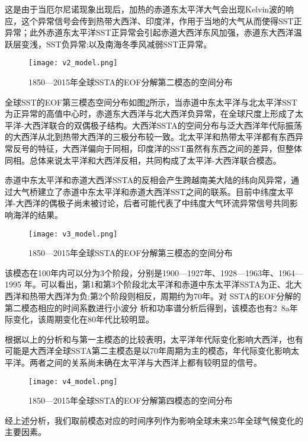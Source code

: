 \documentclass[bwprint]{gmcmthesis}
\begin{document}
这是由于当厄尔尼诺现象出现后，加热的赤道东太平洋大气会出现Kelvin波的响应，这个异常信号会传到热带大西洋、印度洋，作用于当地的大气从而使得SST正异常；此外赤道东太平洋SST正异常会引起赤道大西洋东风加强，赤道东大西洋温跃层变浅\cite{Dunstone2010Impact}，SST负异常;以及南海冬季风减弱SST正异常\cite{Nicholls1999Cognitive}。

\begin{figure}[ht]
\centering
\texttt{[image: v2\_model.png]}
\caption{1850—2015年全球SSTA的EOF分解第二模态的空间分布}\label{v2m}
\end{figure}

全球SST的EOF第三模态空间分布如图\ref{v3m}所示，当赤道中东太平洋与北太平洋SST为正异常的高值中心时，赤道东大西洋与北大西洋负异常，在全球尺度上形成了太平洋-大西洋联合的双偶极子结构。大西洋SSTA的空间分布与泛大西洋年代际振荡的大西洋从北到热带大西洋的三极分布较一致。北太平洋和热带太平洋都有东西异常反号的特征，大西洋偏向于同相，印度洋的SST虽然有东西之间的差异，但整体同相。总体来说太平洋和大西洋反相\cite{Dunstone2010Impact}，共同构成了太平洋-大西洋联合模态。

赤道中东太平洋和赤道大西洋SSTA的反相会产生跨越南美大陆的纬向风异常，通过大气桥建立了赤道中东太平洋和赤道大西洋SST之间的联系。目前中纬度太平洋-大西洋的偶极子尚未被讨论，后者可能代表了中纬度大气环流异常信号共同影响海洋的结果。

\begin{figure}[ht]
\centering
\texttt{[image: v3\_model.png]}
\caption{1850—2015年全球SSTA的EOF分解第三模态的空间分布}\label{v3m}
\end{figure}

该模态在100年内可以分为3个阶段，分别是1900—1927年、1928—1963年、1964—1995 年。可以看出，第1和第3个阶段北太平洋和赤道中东太平洋SSTA为正、北大西洋和热带大西洋为负;第2个阶段则相反，周期约为70年。对 SSTA的EOF分解的第二模态相应的时间系数进行小波分 析和功率谱分析后得到，该模态也有2~8a年际变化，该周期变化在80年代比较明显。

根据以上的分析和与第一主模态的比较表明，太平洋年代际变化影响大西洋，也有可能是大西洋全球SSTA第二主模态是以70年周期为主的模态，年代际变化影响太平洋。两者之间的关系尚未确在太平洋与大西洋上都有较明显的信号\cite{St2009Climate}。

\begin{figure}[ht]
\centering
\texttt{[image: v4\_model.png]}
\caption{1850—2015年全球SSTA的EOF分解第四模态的空间分布}\label{v4m}
\end{figure}


经上述分析，我们取前模态对应的时间序列作为影响全球未来25年全球气候变化的主要因素\cite{Hastenrath1995Recent}。
\end{document}
